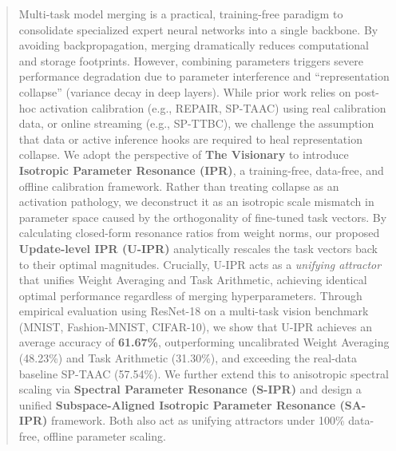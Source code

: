 \documentclass{article}
\begin{document}

\printAffiliationsAndNotice{}

\begin{abstract}
Multi-task model merging is a practical, training-free paradigm to consolidate specialized expert neural networks into a single backbone. By avoiding backpropagation, merging dramatically reduces computational and storage footprints. However, combining parameters triggers severe performance degradation due to parameter interference and ``representation collapse'' (variance decay in deep layers). While prior work relies on post-hoc activation calibration (e.g., REPAIR, SP-TAAC) using real calibration data, or online streaming (e.g., SP-TTBC), we challenge the assumption that data or active inference hooks are required to heal representation collapse. We adopt the perspective of \textbf{The Visionary} to introduce \textbf{Isotropic Parameter Resonance (IPR)}, a training-free, data-free, and offline calibration framework. Rather than treating collapse as an activation pathology, we deconstruct it as an isotropic scale mismatch in parameter space caused by the orthogonality of fine-tuned task vectors. By calculating closed-form resonance ratios from weight norms, our proposed \textbf{Update-level IPR (U-IPR)} analytically rescales the task vectors back to their optimal magnitudes. Crucially, U-IPR acts as a \textit{unifying attractor} that unifies Weight Averaging and Task Arithmetic, achieving identical optimal performance regardless of merging hyperparameters. Through empirical evaluation using ResNet-18 on a multi-task vision benchmark (MNIST, Fashion-MNIST, CIFAR-10), we show that U-IPR achieves an average accuracy of \textbf{61.67\%}, outperforming uncalibrated Weight Averaging (48.23\%) and Task Arithmetic (31.30\%), and exceeding the real-data baseline SP-TAAC (57.54\%). We further extend this to anisotropic spectral scaling via \textbf{Spectral Parameter Resonance (S-IPR)} and design a unified \textbf{Subspace-Aligned Isotropic Parameter Resonance (SA-IPR)} framework. Both also act as unifying attractors under 100\% data-free, offline parameter scaling.
\end{abstract}
\end{document}
